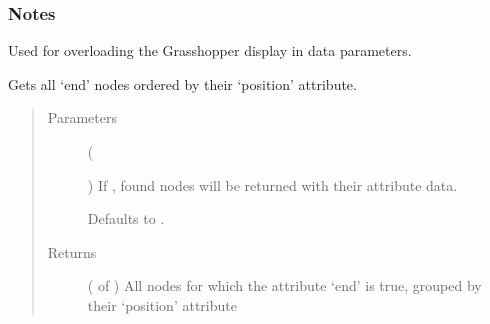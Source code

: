 \documentclass[letterpaper,10pt,english]{sphinxmanual}
\begin{document}
\begin{fulllineitems}
\begin{fulllineitems}
\begin{quote}
\begin{description}
\end{description}\end{quote}
\subsubsection*{Notes}

Used for overloading the Grasshopper display in data parameters.

\end{fulllineitems}


\begin{fulllineitems}
\label{\detokenize{cockatoo:cockatoo.KnitNetworkBase.all_ends_by_position}}
Gets all ‘end’ nodes ordered by their ‘position’ attribute.
\begin{quote}\begin{description}
\item[{Parameters}] \leavevmode
{} (%
\begin{footnote}[70]\sphinxAtStartFootnote
{}
%
\end{footnote}\sphinxstyleliteralemphasis{\sphinxupquote{, }}) \textendash{} 
If , found nodes will be returned with their attribute
data.

Defaults to .


\item[{Returns}] \leavevmode
{} ( of ) \textendash{} All nodes for which the attribute ‘end’ is true, grouped by their
‘position’ attribute

\end{description}\end{quote}

\end{fulllineitems}



\end{fulllineitems}
\end{document}

